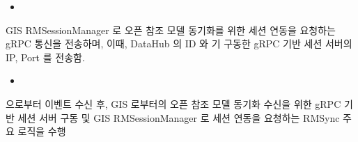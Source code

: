 \documentclass[a4paper,10pt,english]{sphinxmanual}
\begin{document}
\begin{fulllineitems}
\begin{fulllineitems}
\begin{quote}
\begin{description}
\begin{itemize}
\end{itemize}

\end{description}\end{quote}


\nopagebreak

\begin{itemize}
\item {} 
\sphinxAtStartPar
{\hyperref[\detokenize{_RMSync:RMSync.Subscribe}]{}}

\end{itemize}



\end{fulllineitems}


\begin{fulllineitems}
\label{\detokenize{_RMSync:RMSync.requestRMSession}}
\pysigstartsignatures
{}
\pysigstopsignatures
\sphinxAtStartPar
GIS RMSessionManager 로 오픈 참조 모델 동기화를 위한 세션 연동을 요청하는 gRPC 통신을 전송하며,
이때, DataHub 의 ID 와 기 구동한 gRPC 기반 세션 서버의 IP, Port 를 전송함.


\nopagebreak

\begin{itemize}
\item {} 
\sphinxAtStartPar
{\hyperref[\detokenize{_RMSync:RMSync.run}]{}}

\end{itemize}



\end{fulllineitems}


\begin{fulllineitems}
\label{\detokenize{_RMSync:RMSync.run}}
\pysigstartsignatures
{}
\pysigstopsignatures
\sphinxAtStartPar
{\hyperref[\detokenize{_DHDaemon:dhdaemon}]{}} 으로부터  이벤트 수신 후, GIS 로부터의 오픈 참조 모델 동기화 수신을 위한
gRPC 기반 세션 서버 구동 및 GIS RMSessionManager 로 세션 연동을 요청하는 RMSync 주요 로직을 수행



\end{fulllineitems}
\end{fulllineitems}
\end{document}
